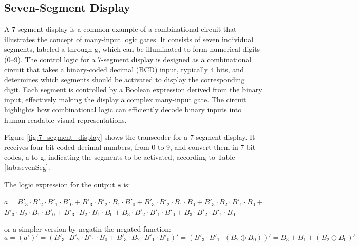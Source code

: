 \subsection{Seven-Segment Display}
A 7-segment display is a common example of a combinational circuit that illustrates the concept of many-input logic gates. It consists of seven individual segments, labeled a through g, which can be illuminated to form numerical digits (0–9). The control logic for a 7-segment display is designed as a combinational circuit that takes a binary-coded decimal (BCD) input, typically 4 bits, and determines which segments should be activated to display the corresponding digit. Each segment is controlled by a Boolean expression derived from the binary input, effectively making the display a complex many-input gate. The circuit highlights how combinational logic can efficiently decode binary inputs into human-readable visual representations.


Figure \ref{fig:7_segment_display} shows the transcoder for a 7-segment display. It receives four-bit coded decimal numbers, from 0 to 9, and convert them in 7-bit codes, a to g, indicating the segments to be activated, according to Table \ref{tab:sevenSeg}.

The logic expression for the output {\tt a} is:
\begin{center}
$a =   B'_3 \cdot B'_2 \cdot B'_1\cdot B'_0  + B'_3 \cdot B'_2 \cdot B_1\cdot B'_0  +
        B'_3 \cdot B'_2 \cdot B_1\cdot B_0  + B'_3 \cdot B_2 \cdot B'_1\cdot B_0  + $ \\
        $B'_3 \cdot B_2 \cdot B_1\cdot B'_0  + B'_3 \cdot B_2 \cdot B_1\cdot B_0  +
        B_3 \cdot B'_2 \cdot B'_1\cdot B'_0  + B_3 \cdot B'_2 \cdot B'_1\cdot B_0  $
\end{center}
or a simpler version by negatin the negated function:
$$a =  (a')' =  (B'_3 \cdot B'_2 \cdot B'_1\cdot B_0  + B'_3 \cdot B_2 \cdot B'_1\cdot B'_0)' = (B'_3 \cdot B'_1 \cdot (B_2 \oplus B_0))' = B_3 + B_1 + (B_2 \oplus B_0)'$$


